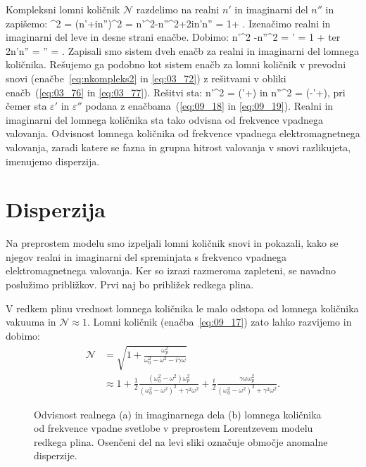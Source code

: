 Kompleksni lomni količnik $\mathcal{N}$ razdelimo na realni $n'$ in imaginarni del $n''$ in 
zapišemo:
\beq
{}^2 = (n'+in'')^2 = n'^2-n''^2+2in'n'' =  1+ .
\label{eq:09_17}
\eeq
Izenačimo realni in imaginarni del leve in desne strani enačbe. Dobimo:
\beq
n'^2 -n''^2 = \varepsilon' = 1 + 
\label{eq:09_18}
\eeq
ter 
\beq
2n'n'' = \varepsilon'' = .
\label{eq:09_19}
\eeq
Zapisali smo sistem dveh enačb za realni in imaginarni del lomnega količnika. Rešujemo ga podobno kot
sistem enačb za lomni količnik v prevodni snovi (enačbe~\ref{eq:nkompleks2} in \ref{eq:03_72})
z rešitvami v obliki enačb~(\ref{eq:03_76} in \ref{eq:03_77}). Rešitvi sta:
\beq
n'^2 = \left(\varepsilon'+\right)
\label{eq:09_20}
\eeq
in
\beq
n''^2 = \left(-\varepsilon'+\right)\!,
\label{eq:09_21}
\eeq
pri čemer sta $\varepsilon'$ in $\varepsilon''$ podana z enačbama~(\ref{eq:09_18} in \ref{eq:09_19}).
Realni in imaginarni del lomnega količnika sta tako odvisna od frekvence vpadnega valovanja. 
Odvisnost lomnega količnika od frekvence vpadnega elektromagnetnega valovanja, zaradi katere
se fazna in grupna hitrost valovanja v snovi razlikujeta, imenujemo disperzija.

\section{Disperzija}
\label{chap:disperzija}
Na preprostem modelu smo izpeljali lomni količnik snovi in pokazali,
kako se njegov realni in imaginarni del
spreminjata s frekvenco vpadnega elektromagnetnega valovanja. Ker so izrazi
razmeroma zapleteni, se navadno poslužimo približkov. Prvi naj 
bo približek redkega plina. 

V redkem plinu vrednost lomnega količnika le malo odstopa od lomnega količnika vakuuma 
in $\mathcal{N} \approx 1$. Lomni količnik (enačba~\ref{eq:09_17}) zato lahko razvijemo in dobimo:
\begin{align}
\mathcal{N} &= \sqrt{1+ \frac{\omega_p^2}{\omega_0^2 - \omega^2 - i\gamma \omega}} \\
&\approx 1 + \frac{1}{2}\frac{\left(\omega_0^2 - \omega^2\right)\omega_p^2}{\left(\omega_0^2 - 
\omega^2\right)^2 + \gamma^2 \omega^2} + \frac{i}{2}\frac{\gamma \omega \omega_p^2}{\left(\omega_0^2 - 
\omega^2\right)^2 + \gamma^2 \omega^2}.
\label{eq:09_22}
\end{align}
\begin{figure}[h!]
\centering
\def\svgwidth{140truemm} 

\caption{Odvisnost realnega (a) in imaginarnega dela (b) lomnega količnika od 
frekvence vpadne svetlobe v preprostem Lorentzevem modelu redkega plina. Osenčeni del na levi 
sliki označuje območje anomalne disperzije.}
\label{fig:09_nkompleks}
\end{figure}

